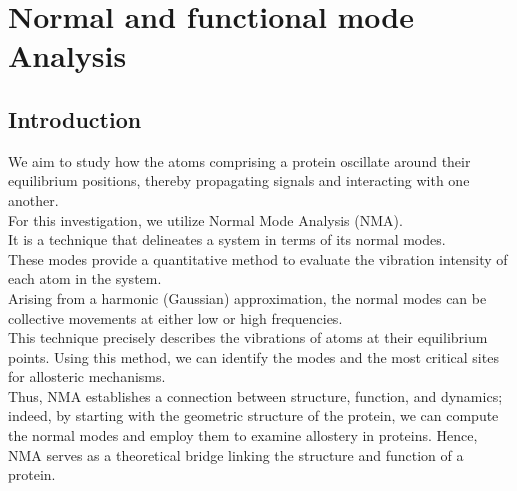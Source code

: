 \documentclass[English, Lau, oneside]{sapthesis}
\begin{document}







\newpage
\chapter{Normal and functional mode Analysis}
\section{Introduction}
\noindent We aim to study how the atoms comprising a protein oscillate around their equilibrium positions, thereby propagating signals and interacting with one another.\\
For this investigation, we utilize Normal Mode Analysis (NMA).\\
It is a technique that delineates a system in terms of its normal modes.\\
These modes provide a quantitative method to evaluate the vibration intensity of each atom in the system.\\
Arising from a harmonic (Gaussian) approximation, the normal modes can be collective movements at either low or high frequencies.\\
This technique precisely describes the vibrations of atoms at their equilibrium points. Using this method, we can identify the modes and the most critical sites for allosteric mechanisms.\\
Thus, NMA establishes a connection between structure, function, and dynamics; indeed, by starting with the geometric structure of the protein, we can compute the normal modes and employ them to examine allostery in proteins.
Hence, NMA serves as a theoretical bridge linking the structure and function of a protein.
\end{document}
